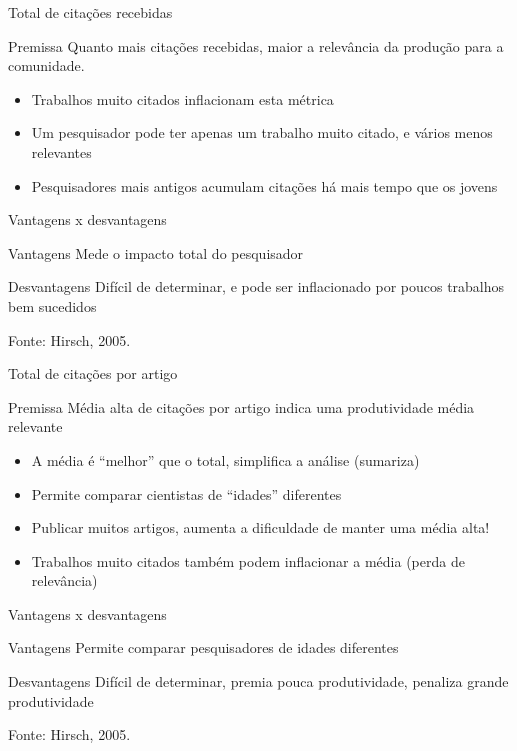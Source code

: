 \documentclass{beamer}
\begin{document}
\begin{frame}{Total de citações recebidas}
  \begin{block}{Premissa}
    Quanto mais citações recebidas, maior a relevância da produção para a comunidade.
  \end{block}
  \begin{itemize}
  \item Trabalhos muito citados inflacionam esta métrica
  \item Um pesquisador pode ter apenas um trabalho muito citado, e vários menos relevantes
  \item Pesquisadores mais antigos acumulam citações há mais tempo que os jovens
  \end{itemize}
\end{frame}

\begin{frame}{Vantagens x desvantagens}
  \begin{block}{Vantagens}
    Mede o impacto total do pesquisador
  \end{block}
  \begin{block}{Desvantagens}
    Difícil de determinar, e pode ser inflacionado por poucos trabalhos bem sucedidos
  \end{block}

\vfill
Fonte: Hirsch, 2005.
\end{frame}

\begin{frame}{Total de citações por artigo}
  \begin{block}{Premissa}
    Média alta de citações por artigo indica uma produtividade média relevante
  \end{block}
  \begin{itemize}
  \item A média é ``melhor'' que o total, simplifica a análise (sumariza)
  \item Permite comparar cientistas de ``idades'' diferentes
  \item Publicar muitos artigos, aumenta a dificuldade de manter uma média alta!
  \item Trabalhos muito citados também podem inflacionar a média (perda de relevância)
  \end{itemize}
\end{frame}

\begin{frame}{Vantagens x desvantagens}
  \begin{block}{Vantagens}
    Permite comparar pesquisadores de idades diferentes
  \end{block}
  \begin{block}{Desvantagens}
    Difícil de determinar, premia pouca produtividade, penaliza grande produtividade
  \end{block}

\vfill
Fonte: Hirsch, 2005.
\end{frame}
\end{document}
